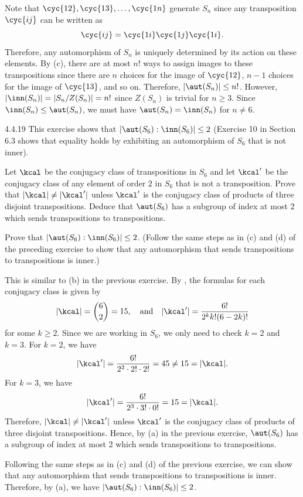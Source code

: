\begin{solenum}[spsol]
	\item Note that $\cyc{1 2}, \cyc{1 3}, \ldots, \cyc{1 n}$ generate $S_n$ since any transposition $\cyc{i j}$ can be written as
	\[
		\cyc{i j} = \cyc{1 i}\cyc{1 j}\cyc{1 i}.
	\]
	Therefore, any automorphism of $S_n$ is uniquely determined by its action on these elements.
	By (c), there are at most $n!$ ways to assign images to these transpositions since there are $n$ choices for the image of $\cyc{1 2}$, $n - 1$ choices for the image of $\cyc{1 3}$, and so on.
	Therefore, $|\aut(S_n)| \leq n!$.
	However, $|\inn(S_n)| = |S_n/Z(S_n)| = n!$ since $Z(S_n)$ is trivial for $n \geq 3$.
	Since $\inn(S_n) \leq \aut(S_n)$, we must have $\aut(S_n) = \inn(S_n)$ for $n \neq 6$.
\end{solenum}

\begin{spex}{4.4.19}
	This exercise shows that $|\aut(S_6):\inn(S_6)|\le 2$ (Exercise 10 in Section 6.3 shows that equality holds by exhibiting an automorphism of $S_6$ that is not inner).
	\begin{subexercises}
		\item Let $\kcal$ be the conjugacy class of transpositions in $S_6$ and let $\kcal'$ be the conjugacy class of any element of order $2$ in $S_6$ that is not a transposition.
		Prove that $|\kcal|\neq|\kcal'|$ unless $\kcal'$ is the conjugacy class of products of three disjoint transpositions.
		Deduce that $\aut(S_6)$ has a subgroup of index at most $2$ which sends transpositions to transpositions.
		\item Prove that $|\aut(S_6):\inn(S_6)|\le 2$. (Follow the same steps as in (c) and (d) of the preceding exercise to show that any automorphism that sends transpositions to transpositions is inner.)
	\end{subexercises}
\end{spex}

\begin{solenum}[spsol]
	\item This is similar to (b) in the previous exercise.
	By , the formulas for each conjugacy class is given by
	\[
		|\kcal| = \binom 62 = 15, \quad \text{and} \quad |\kcal'| = \frac{6!}{2^k k! (6 - 2k)!}
	\]
	for some $k \geq 2$.
	Since we are working in $S_6$, we only need to check $k = 2$ and $k = 3$.
	For $k = 2$, we have
	\[
		|\kcal'| = \frac{6!}{2^2 \cdot 2! \cdot 2!} = 45 \neq 15 = |\kcal|.
	\]
	For $k = 3$, we have
	\[
		|\kcal'| = \frac{6!}{2^3 \cdot 3! \cdot 0!} = 15 = |\kcal|.
	\]
	Therefore, $|\kcal| \neq |\kcal'|$ unless $\kcal'$ is the conjugacy class of products of three disjoint transpositions.
	Hence, by (a) in the previous exercise, $\aut(S_6)$ has a subgroup of index at most 2 which sends transpositions to transpositions.
	\item Following the same steps as in (c) and (d) of the previous exercise, we can show that any automorphism that sends transpositions to transpositions is inner.
	Therefore, by (a), we have $|\aut(S_6) : \inn(S_6)| \leq 2$.
\end{solenum}


